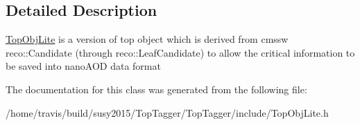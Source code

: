 \subsection{Detailed Description}
\hyperlink{classTopObjLite}{Top\-Obj\-Lite} is a version of top object which is derived from cmssw reco\-::\-Candidate (through reco\-::\-Leaf\-Candidate) to allow the critical information to be saved into nano\-A\-O\-D data format 

The documentation for this class was generated from the following file\-:\begin{DoxyCompactItemize}
\item 
/home/travis/build/susy2015/\-Top\-Tagger/\-Top\-Tagger/include/Top\-Obj\-Lite.\-h\end{DoxyCompactItemize}
